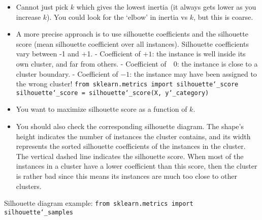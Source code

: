 \vspace{-3.0mm}
\begin{itemize}
\item
Cannot just pick $k$ which gives the lowest inertia (it always gets lower as you increase $k$).
You could look for the `elbow' in inertia vs $k$, but this is coarse.
\item
A more precise approach is to use silhouette coefficients and the silhouette score (mean silhouette coefficient over all instances).
Silhouette coefficients vary between -1 and +1.\newline
- Coefficient of $+1$: the instance is well inside its own cluster, and far from others.\newline
- Coefficient of $\,\,\,\,0$: the instance is close to a cluster boundary.\newline
- Coefficient of $-1$: the instance may have been assigned to the wrong cluster!\newline
\texttt{from sklearn.metrics import silhouette\char`_score}\newline
\texttt{silhouette\char`_score = silhouette\char`_score(X, y\char`_category)}
\item
You want to maximize silhouette score as a function of $k$.
\item
You should also check the corresponding silhouette diagram.\newline
The shape's height indicates the number of instances the cluster contains,
and its width represents the sorted silhouette coefficients of the instances in the cluster.
The vertical dashed line indicates the silhouette score.
When most of the instances in a cluster have a lower coefficient than this score,
then the cluster is rather bad since this means its instances are much too close to other clusters.
\end{itemize}

\newpage
Silhouette diagram example:\newline
\texttt{from sklearn.metrics import silhouette\char`_samples}

